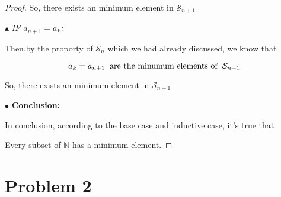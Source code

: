 \documentclass[12pt]{article}
\begin{document}
\begin{proof}
    \vspace*{0.3cm}
    \hspace*{2cm}
    So, there exists an minimum element in $\mathcal{S}_{n+1}$

    \newpage
    \hspace*{2cm}
    $\blacktriangle$ \textit{IF $a_{n+1} = a_k$:}

    \vspace*{0.3cm}
    \hspace*{2cm}
    Then,by the proporty of $\mathcal{S}_n$ which we had already discussed, we know that

    \[ a_k = a_{n+1} \hspace*{0.2cm} \text{are the minumum elements of}  \hspace*{0.2cm}\mathcal{S}_{n+1} \]

    \vspace*{0.3cm}
    \hspace*{2cm}
    So, there exists an minimum element in $\mathcal{S}_{n+1} $

    \vspace*{0.3cm}
    \hspace*{1.2cm}
    $\bullet$ \textbf{Conclusion:}

    \vspace*{0.3cm}
    \hspace*{1.2cm}
    In conclusion, according to the base case and inductive case, it's true that

    \vspace*{0.3cm}
    \hspace*{1.2cm}
    Every subset of $\mathbb{N}$ has a minimum element.

\end{proof}

\newpage
\section*{Problem 2}
\end{document}
